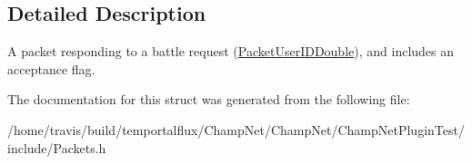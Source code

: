 \subsection{Detailed Description}
A packet responding to a battle request (\hyperlink{struct_packet_user_i_d_double}{Packet\-User\-I\-D\-Double}), and includes an acceptance flag. 

The documentation for this struct was generated from the following file\-:\begin{DoxyCompactItemize}
\item 
/home/travis/build/temportalflux/\-Champ\-Net/\-Champ\-Net/\-Champ\-Net\-Plugin\-Test/include/Packets.\-h\end{DoxyCompactItemize}
